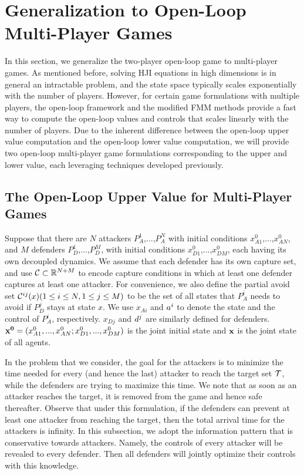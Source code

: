 \section{Generalization to Open-Loop Multi-Player Games}
\label{sec:multiPlayer}

In this section, we generalize the two-player open-loop game to multi-player games. 
As mentioned before, solving HJI equations in high dimensions is in general an intractable problem, and
the state space typically scales exponentially with the number of players. 
However, for certain game formulations with multiple players, the open-loop framework and the modified FMM methods provide a fast way to 
compute the open-loop values and controls that scales linearly with the number of players. 
Due to the inherent difference between the open-loop upper value computation and the open-loop lower value computation, we will provide two open-loop multi-player game formulations corresponding
to the upper and lower value, each leveraging techniques developed previously. 

\subsection{The Open-Loop Upper Value for Multi-Player Games}
Suppose that there are $N$ attackers $P_A^1$,...,$P_A^N$ with 
initial conditions $x_{A1}^0$,...,$x_{AN}^0$, and $M$
defenders $P_D^1$,...,$P_D^M$, with 
initial conditions $x_{D1}^0$,...,$x_{DM}^0$, each having its own 
decoupled dynamics.
We assume that each defender has its own capture set, and use $\mathcal{C} \subset  \mathbb{R}^{N+M}$ to encode capture conditions in which at least one defender captures at least one attacker. 
For convenience, we also define the partial avoid set $\mathcal{C}^{ij}(x) (1 \le i\le N, 1 \le j \le M)$ to be the set of
all states that $P_A^i$ needs to avoid if $P_D^j$ stays at state $x$.
We use $x_{Ai}$ and $a^{i}$ to denote the state and the control of $P_A^i$, respectively.
$x_{Dj}$ and $d^{j}$ are similarly defined for defenders.
 $\mathbf{x^0} = (x_{A1}^0,...,x_{AN}^0;x_{D1}^0,...,x_{DM}^0)$ is the joint initial state and 
$\mathbf{x}$ is the joint state of all agents.

In the problem that we consider, the goal for the attackers is to minimize the time needed for every (and hence the last) attacker to reach the target set $\mathcal{T}$, while the defenders are trying to maximize this time. We note that as soon as an attacker reaches the target, it is removed from the game and hence safe thereafter.
Observe that under this formulation, if the defenders can prevent at least one attacker from reaching the target, then the total arrival time for the attackers is infinity.
In this subsection, we adopt the information pattern that is conservative towards attackers. 
Namely, the controls of every attacker will be revealed to every defender. 
Then all defenders will jointly optimize their controls with this knowledge.

